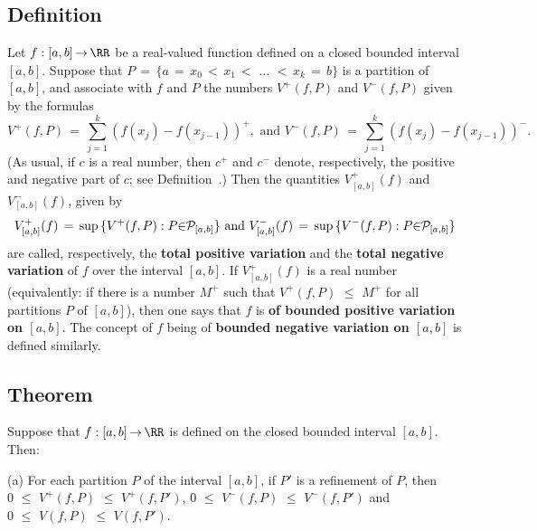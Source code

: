 \V

             \subsection{\small{\bf Definition}}
            \label{DefF40.190B}

                Let $f:[a,b] \,{\rightarrow}\, {\RR}$ be a real-valued function defined on a closed bounded interval $[a,b]$.
    Suppose that $P \,=\, \{a \,=\, x_{0}\,<\,x_{1}\,<\,\,{\ldots}\,\,<\,x_{k} \,=\, b\}$ is a partition of $[a,b]$, 
    and associate with $f$ and $P$ the numbers $V^{+}(f,P)$ and $V^{-}(f,P)$ given by the formulas
        \begin{equation}
        \label{EqnF.95B}
        V^{+}(f,P) \,=\, \sum_{j=1}^{k} \left(f(x_{j})-f(x_{j-1})\right)^{+}, \mbox{ and }
        V^{-}(f,P) \,=\, \sum_{j=1}^{k} \left(f(x_{j})-f(x_{j-1})\right)^{-}. 
        \end{equation}
    (As usual, if $c$ is a real number, then $c^{+}$ and $c^{-}$ denote, respectively, the positive and negative part of $c$;
    see Definition~.)
    Then the quantities $V^{+}_{[a,b]}(f)$ and $V^{-}_{[a,b]}(f)$, given by
        \begin{displaymath}
        V^{+}_{[a,b]}(f) \,=\, {\sup}\,\{V^{+}(f,P): P{\in}{\cal P}_{[a,b]}\} \mbox{ and }
    V^{-}_{[a,b]}(f) \,=\, {\sup}\,\{V^{-}(f,P): P{\in}{\cal P}_{[a,b]}\}
        \end{displaymath}
   are called, respectively, the {\bf total positive variation} and the {\bf total negative variation} of $f$ over the interval $[a,b]$.
    If $V^{+}_{[a,b]}(f)$ is a real number (equivalently: if there is a number $M^{+}$ such that $V^{+}(f,P)\,\,{\leq}\,\,M^{+}$ for all partitions $P$ of $[a,b]$),
    then one says that $f$ is {\bf of bounded positive variation on $[a,b]$}.
    The concept of $f$ being of {\bf bounded negative variation on $[a,b]$} is defined similarly.

\V

             \subsection{\small{\bf Theorem}}
            \label{ThmF40.195}

\V


        Suppose that $f:[a,b] \,{\rightarrow}\, {\RR}$ is defined on the closed bounded interval $[a,b]$.
    Then:

        (a) For each partition $P$ of the interval $[a,b]$, if $P'$ is a refinement of $P$, then $0\,\,{\leq}\,\,V^{+}(f,P)\,\,{\leq}\,\,V^{+}(f,P')$, $0\,\,{\leq}\,\,V^{-}(f,P)\,\,{\leq}\,\,V^{-}(f,P')$ and $0\,\,{\leq}\,\,V(f,P)\,\,{\leq}\,\,V(f,P')$.

